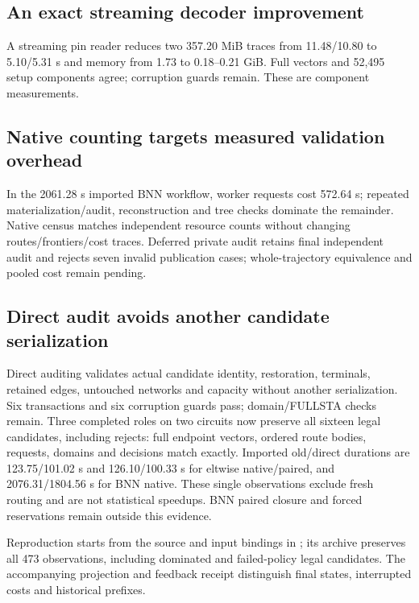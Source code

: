 \documentclass[conference,10pt]{IEEEtran}
\begin{document}
\subsection{An exact streaming decoder improvement}
A streaming pin reader reduces two 357.20 MiB traces from 11.48/10.80 to 5.10/5.31 s and memory from 1.73 to 0.18--0.21 GiB. Full vectors and 52,495 setup components agree; corruption guards remain. These are component measurements.

\subsection{Native counting targets measured validation overhead}
In the 2061.28 s imported BNN workflow, worker requests cost 572.64 s; repeated materialization/audit, reconstruction and tree checks dominate the remainder. Native census matches independent resource counts without changing routes/frontiers/cost traces. Deferred private audit retains final independent audit and rejects seven invalid publication cases; whole-trajectory equivalence and pooled cost remain pending.

\subsection{Direct audit avoids another candidate serialization}
Direct auditing validates actual candidate identity, restoration, terminals, retained edges, untouched networks and capacity without another serialization. Six transactions and six corruption guards pass; domain/FULLSTA checks remain. Three completed roles on two circuits now preserve all sixteen legal candidates, including rejects: full endpoint vectors, ordered route bodies, requests, domains and decisions match exactly. Imported old/direct durations are 123.75/101.02 s and 126.10/100.33 s for eltwise native/paired, and 2076.31/1804.56 s for BNN native. These single observations exclude fresh routing and are not statistical speedups. BNN paired closure and forced reservations remain outside this evidence.

Reproduction starts from the source and input bindings in ; its archive preserves all 473 observations, including dominated and failed-policy legal candidates. The accompanying projection and feedback receipt distinguish final states, interrupted costs and historical prefixes.
\end{document}

